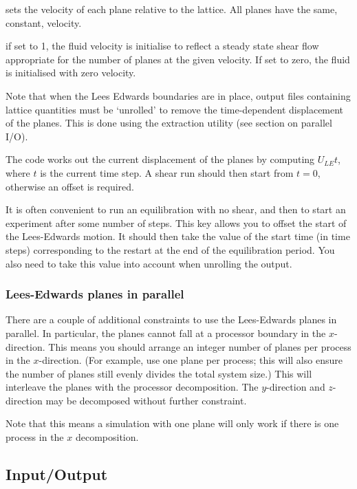 sets the velocity of each plane relative to the lattice. All planes
have the same, constant, velocity.


if set to 1, the fluid velocity is initialise to reflect a steady
state shear flow appropriate for the number of planes at the
given velocity. If set to zero, the fluid is initialised with
zero velocity.

Note that when the Lees Edwards boundaries are in place, output
files containing lattice quantities must be `unrolled' to remove
the time-dependent displacement of the planes. This is done using
the extraction utility (see section on parallel I/O).

The code works out the
current displacement of the planes by computing $U_{LE} t$, where
$t$ is the current time step. A shear run should then start from
$t = 0$, otherwise an offset is required.


It is often convenient to run an equilibration with no shear, and
then to start an experiment after some number of steps. This
key allows you to offset the start of the Lees-Edwards motion.
It should then take the value of the start time (in time steps)
corresponding to the restart at the end of the equilibration
period. You also need to take this value into account when unrolling
the output.

\subsubsection{Lees-Edwards planes in parallel} 

There are a couple of additional constraints to use the Lees-Edwards
planes in parallel. In particular, the planes cannot fall at a
processor boundary in the $x$-direction. This means you should
arrange an integer number of planes per process in the $x$-direction.
(For example, use one plane per process; this will also ensure the number
of planes
still evenly divides the total system size.)
This will interleave the planes with the processor decomposition.
The $y$-direction and $z$-direction may be decomposed without
further constraint.

Note that this means a simulation with one plane will only work
if there is one process in the $x$ decomposition.

\subsection{Input/Output}

